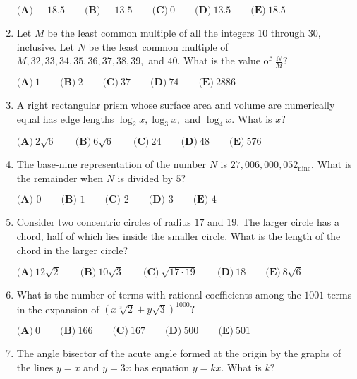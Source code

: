 \documentclass{article}
\begin{document}
\begin{enumerate}[label=\arabic*., itemsep=0.5em]
$\textbf{(A)}\ {-}18.5  \qquad\textbf{(B)}\ {-}13.5 \qquad\textbf{(C)}\ 0 \qquad\textbf{(D)}\ 13.5 \qquad\textbf{(E)}\ 18.5$\par \vspace{0.5em}\item Let $M$ be the least common multiple of all the integers $10$ through $30,$ inclusive. Let $N$ be the least common multiple of $M,32,33,34,35,36,37,38,39,$ and $40.$ What is the value of $\frac{N}{M}?$

$\textbf{(A)}\ 1 \qquad\textbf{(B)}\ 2 \qquad\textbf{(C)}\ 37 \qquad\textbf{(D)}\ 74 \qquad\textbf{(E)}\ 2886$\par \vspace{0.5em}\item A right rectangular prism whose surface area and volume are numerically equal has edge lengths $\log_{2}x, \log_{3}x,$ and $\log_{4}x.$ What is $x?$

$\textbf{(A)}\ 2\sqrt{6} \qquad\textbf{(B)}\ 6\sqrt{6} \qquad\textbf{(C)}\ 24 \qquad\textbf{(D)}\ 48 \qquad\textbf{(E)}\ 576$\par \vspace{0.5em}\item The base-nine representation of the number $N$ is $27{,}006{,}000{,}052_{\text{nine}}.$ What is the remainder when $N$ is divided by $5?$

$\textbf{(A) } 0\qquad\textbf{(B) } 1\qquad\textbf{(C) } 2\qquad\textbf{(D) } 3\qquad\textbf{(E) }4$\par \vspace{0.5em}\item Consider two concentric circles of radius $17$ and $19.$ The larger circle has a chord, half of which lies inside the smaller circle. What is the length of the chord in the larger circle?

$\textbf{(A)}\ 12\sqrt{2} \qquad\textbf{(B)}\ 10\sqrt{3} \qquad\textbf{(C)}\ \sqrt{17 \cdot 19} \qquad\textbf{(D)}\ 18 \qquad\textbf{(E)}\ 8\sqrt{6}$\par \vspace{0.5em}\item What is the number of terms with rational coefficients among the $1001$ terms in the expansion of $\left(x\sqrt[3]{2}+y\sqrt{3}\right)^{1000}?$

$\textbf{(A)}\ 0 \qquad\textbf{(B)}\ 166 \qquad\textbf{(C)}\ 167 \qquad\textbf{(D)}\ 500 \qquad\textbf{(E)}\ 501$\par \vspace{0.5em}\item The angle bisector of the acute angle formed at the origin by the graphs of the lines $y = x$ and $y=3x$ has equation $y=kx.$ What is $k?$


\end{enumerate}
\end{document}
